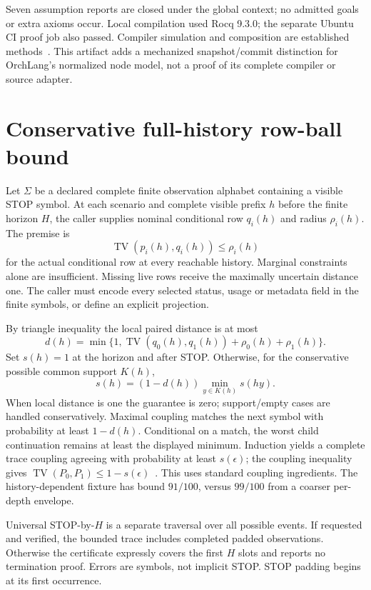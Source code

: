 \documentclass[11pt,a4paper]{article}
\newcommand{\TV}{\operatorname{TV}}
\begin{document}
Seven assumption reports are closed under the global context; no admitted goals or extra axioms occur. Local compilation used Rocq 9.3.0; the separate Ubuntu CI proof job also passed. Compiler simulation and composition are established methods~\cite{leroy}. This artifact adds a mechanized snapshot/commit distinction for OrchLang's normalized node model, not a proof of its complete compiler or source adapter.

\section{Conservative full-history row-ball bound}
Let $\Sigma$ be a declared complete finite observation alphabet containing a visible STOP symbol. At each scenario and complete visible prefix $h$ before the finite horizon $H$, the caller supplies nominal conditional row $q_i(h)$ and radius $\rho_i(h)$. The premise is
\[
\TV(p_i(h),q_i(h))\leq\rho_i(h)
\]
for the actual conditional row at every reachable history. Marginal constraints alone are insufficient. Missing live rows receive the maximally uncertain distance one. The caller must encode every selected status, usage or metadata field in the finite symbols, or define an explicit projection.

By triangle inequality the local paired distance is at most
\[
d(h)=\min\{1,\TV(q_0(h),q_1(h))+\rho_0(h)+\rho_1(h)\}.
\]
Set $s(h)=1$ at the horizon and after STOP. Otherwise, for the conservative possible common support $K(h)$,
\[
s(h)=(1-d(h))\min_{y\in K(h)}s(hy).
\]
When local distance is one the guarantee is zero; support/empty cases are handled conservatively. Maximal coupling matches the next symbol with probability at least $1-d(h)$. Conditional on a match, the worst child continuation remains at least the displayed minimum. Induction yields a complete trace coupling agreeing with probability at least $s(\epsilon)$; the coupling inequality gives $\TV(P_0,P_1)\leq1-s(\epsilon)$~\cite{coupling}. This uses standard coupling ingredients. The history-dependent fixture has bound $91/100$, versus $99/100$ from a coarser per-depth envelope.

Universal STOP-by-$H$ is a separate traversal over all possible events. If requested and verified, the bounded trace includes completed padded observations. Otherwise the certificate expressly covers the first $H$ slots and reports no termination proof. Errors are symbols, not implicit STOP. STOP padding begins at its first occurrence.
\end{document}
